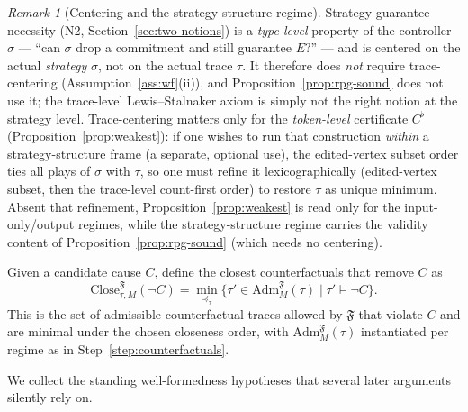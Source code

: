 \documentclass[11pt]{article}
\theoremstyle{remark}
\newtheorem{remark}{Remark}
\newcommand{\Close}{\mathrm{Close}}
\newcommand{\Frame}{\mathfrak{F}}
\newcommand{\Adm}{\mathrm{Adm}}
\begin{document}
\begin{remark}[Centering and the strategy-structure regime]
\label{rem:strat-centering}
Strategy-guarantee necessity (N2, Section~\ref{sec:two-notions}) is a
\emph{type-level} property of the controller \(\sigma\) --- ``can \(\sigma\) drop
a commitment and still guarantee \(E\)?'' --- and is centered on the actual
\emph{strategy} \(\sigma\), not on the actual trace \(\tau\). It therefore does
\emph{not} require trace-centering (Assumption~\ref{ass:wf}(ii)), and
Proposition~\ref{prop:rpg-sound} does not use it; the trace-level Lewis--Stalnaker
axiom is simply not the right notion at the strategy level. Trace-centering matters
only for the \emph{token-level} certificate \(C^{\flat}\)
(Proposition~\ref{prop:weakest}): if one wishes to run that construction
\emph{within} a strategy-structure frame (a separate, optional use), the
edited-vertex subset order ties all plays of \(\sigma\) with \(\tau\), so one must
refine it lexicographically (edited-vertex subset, then the trace-level
count-first order) to restore \(\tau\) as unique minimum. Absent that refinement,
Proposition~\ref{prop:weakest} is read only for the input-only/output regimes,
while the strategy-structure regime carries the validity content of
Proposition~\ref{prop:rpg-sound} (which needs no centering).
\end{remark}

Given a candidate cause \(C\), define the closest counterfactuals that remove
\(C\) as
\[
  \Close_{\tau,M}^{\Frame}(\neg C)
  =
  \min_{\preceq_\tau}
  \{
    \tau'\in \Adm_M^{\Frame}(\tau)
    \mid
    \tau'\models \neg C
  \}.
\]
This is the set of admissible counterfactual traces allowed by \(\Frame\) that
violate \(C\) and are minimal under the chosen closeness order, with
\(\Adm_M^{\Frame}(\tau)\) instantiated per regime as in Step~\ref{step:counterfactuals}.

We collect the standing well-formedness hypotheses that several later arguments
silently rely on.
\end{document}
